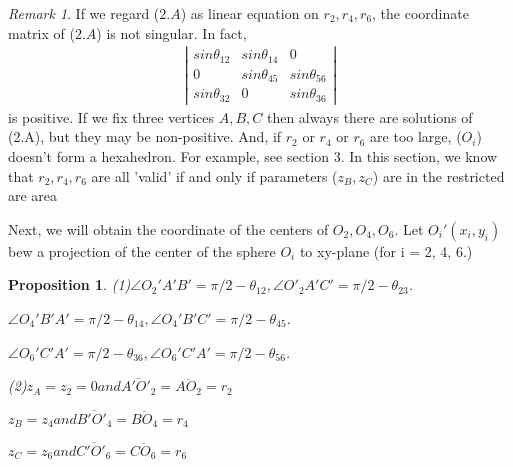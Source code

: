 \documentclass[dvipdfmx]{interact}
\theoremstyle{plain}%
\newtheorem{proposition}[theorem]{Proposition}
\theoremstyle{definition}
\theoremstyle{remark}
\newtheorem{remark}{Remark}
\theoremstyle{problemstyle}
\begin{document}
\begin{remark}
 If we regard ($2.A$) as linear equation on $r_2, r_4, r_6$, the
 coordinate matrix of ($2.A$) is not singular. In fact,
 \begin{eqnarray*}
  \left| 
   \begin{array}{ccc}
    sin\theta_{12} & sin\theta_{14} & 0\\
    0              & sin\theta_{45} & sin\theta_{56}\\
    sin\theta_{32} & 0              & sin\theta_{36}
   \end{array}
  \right|
 \end{eqnarray*}
 is positive.
 If we fix three vertices $A, B, C$ then always there are solutions of
 (2.A), but they may be non-positive. And, if $r_2$ or $r_4$ or $r_6$
 are too large, ($O_i$) doesn't form a hexahedron. For example, see
 section 3. In this section, we know that $r_2, r_4, r_6$ are all
 'valid' if and only if parameters ($z_B, z_C$) are in the restricted are
 area

Next, we will obtain the coordinate of the centers of $O_2, O_4, O_6$.
Let $O_i'(x_i, y_i)$bew a projection of the center of the sphere $O_i$
 to xy-plane (for i = 2, 4, 6.)
\end{remark}

\begin{proposition}
 (1)$\angle O_2'A'B' = \pi/2 - \theta_{12}, \angle
 O'_2A'C'=\pi/2-\theta_{23}$.

  $\angle O_4'B'A' = \pi/2 - \theta_{14}, \angle O_4'B'C' = \pi/2 -
 \theta_{45}$.

 $\angle O_6'C'A' = \pi/2 - \theta_{36}, \angle O_6'C'A' = \pi/2 - \theta_{56}$.

 (2)$z_A = z_2 = 0 and \overline{A'O'_2} = \overline{AO_2} = r_2$

 $z_B = z_4 and \overline{B'O'_4} = \overline{BO_4} = r_4$

 $z_C = z_6 and \overline{C'O'_6} = \overline{CO_6} = r_6$
\end{proposition}
\end{document}
